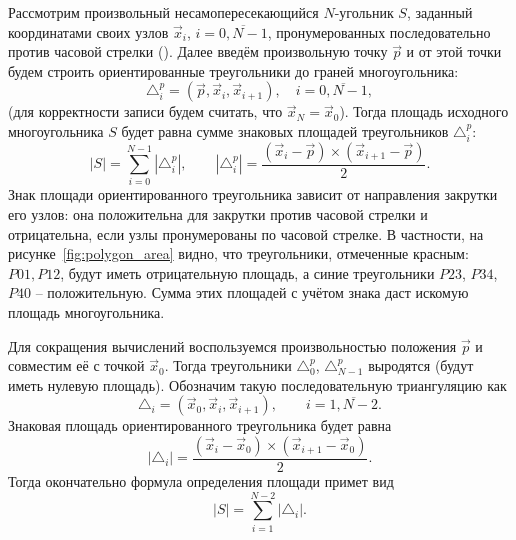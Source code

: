 Рассмотрим произвольный несамопересекающийся $N$-угольник $S$,
заданный координатами своих узлов $\vec x_i$, $i=\overline{0, N-1}$,
пронумерованных последовательно против часовой стрелки ().
Далее введём произвольную точку $\vec p$ и 
от этой точки будем строить ориентированные треугольники до граней многоугольника:
$$
\triangle^p_i = (\vec p, \vec x_i, \vec x_{i+1}), \quad i=\overline{0, N-1},
$$
(для корректности записи будем считать, что $\vec x_N = \vec x_0$).
Тогда площадь исходного многоугольника $S$ будет равна сумме
знаковых площадей треугольников $\triangle^p_i$:
$$
|S| = \sum_{i=0}^{N-1} |\triangle^p_i|, \qquad |\triangle^p_i| = \frac{(\vec x_i - \vec p) \times (\vec x_{i+1} - \vec p)}{2}.
$$
Знак площади ориентированного треугольника зависит от направления закрутки его узлов:
она положительна для закрутки против часовой стрелки и отрицательна, если узлы пронумерованы по часовой стрелке.
В частности, на рисунке~\ref{fig:polygon_area} видно, что треугольники, отмеченные красным: $P01, P12$, будут
иметь отрицательную площадь, а синие треугольники $P23$, $P34$, $P40$ -- положительную. Сумма этих площадей
с учётом знака даст искомую площадь многоугольника.

Для сокращения вычислений воспользуемся произвольностью положения $\vec p$ и совместим
её с точкой $\vec x_0$. Тогда треугольники $\triangle^p_0$, $\triangle^p_{N-1}$
выродятся (будут иметь нулевую площадь).
Обозначим такую последовательную триангуляцию как
\begin{equation}
\label{eq:seq_polygon_triangulation}
\triangle_i = (\vec x_0, \vec x_i, \vec x_{i+1}), \qquad i=\overline{1,N-2}.
\end{equation}
Знаковая площадь ориентированного треугольника будет равна
\begin{equation}
\label{eq:seq_triangle_area}
|\triangle_i| = \frac{(\vec x_i - \vec x_0) \times (\vec x_{i+1} - \vec x_0)}{2}.
\end{equation}
Тогда окончательно формула определения площади примет вид
\begin{equation}
\label{eq:polygon_area}
|S| = \sum_{i=1}^{N-2}|\triangle_i|.
\end{equation}

